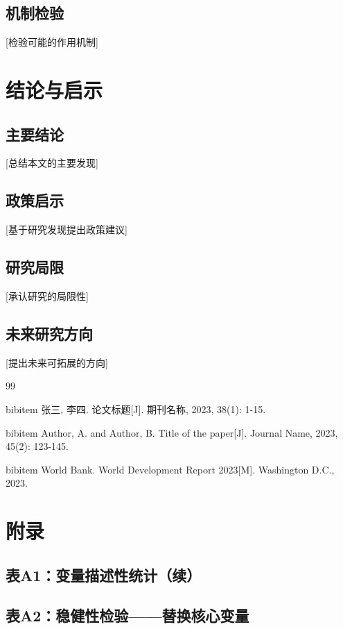 \documentclass[UTF8, a4paper, 12pt]{ctexart}
\numberwithin{equation}{section}
\begin{document}
\subsection{机制检验}
[检验可能的作用机制]

\section{结论与启示}

\subsection{主要结论}
[总结本文的主要发现]

\subsection{政策启示}
[基于研究发现提出政策建议]

\subsection{研究局限}
[承认研究的局限性]

\subsection{未来研究方向}
[提出未来可拓展的方向]

\newpage
\begin{thebibliography}{99}
\addtolength{\itemsep}{-1ex}

bibitem{} 张三, 李四. 论文标题[J]. 期刊名称, 2023, 38(1): 1-15.

bibitem{} Author, A. and Author, B. Title of the paper[J]. Journal Name, 2023, 45(2): 123-145.

bibitem{} World Bank. World Development Report 2023[M]. Washington D.C., 2023.

\end{thebibliography}

\newpage
\appendix
\section*{附录}

\subsection*{表A1：变量描述性统计（续）}

\subsection*{表A2：稳健性检验——替换核心变量}
\end{document}
